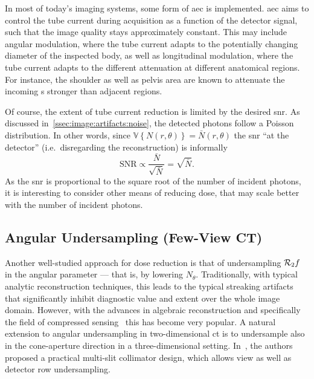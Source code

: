\documentclass[../ml-ct.tex]{subfiles}
\begin{document}
In most of today's imaging systems, some form of \gls{aec} is implemented.
\gls{aec} aims to control the tube current during acquisition as a function of the detector signal, such that the image quality stays approximately constant.
This may include angular modulation, where the tube current adapts to the potentially changing diameter of the inspected body, as well as longitudinal modulation, where the tube current adapts to the different attenuation at different anatomical regions.
For instance, the shoulder as well as pelvis area are known to attenuate the incoming \xray{}s stronger than adjacent regions.

Of course, the extent of tube current reduction is limited by the desired \gls{snr}.
As discussed in~\cref{ssec:image:artifacts:noise}, the detected photons follow a Poisson distribution.
In other words, since \( \mathbb{V} \left\{ N(r, \theta) \right\} = \bar{N}(r, \theta) \) the \gls{snr} \enquote{at the detector} (i.e.\ disregarding the reconstruction) is informally
\begin{equation}
	\mathrm{SNR} \propto \frac{\bar{N}}{\sqrt{\bar{N}}} = \sqrt{\bar{N}}.
\end{equation}
As the \gls{snr} is proportional to the square root of the number of incident photons, it is interesting to consider other means of reducing dose, that may scale better with the number of incident photons.
\subsection{Angular Undersampling (Few-View CT)}
Another well-studied approach for dose reduction is that of undersampling \( \mathcal{R}_2 f \) in the angular parameter --- that is, by lowering \( N_\theta \).
Traditionally, with typical analytic reconstruction techniques, this leads to the typical streaking artifacts that significantly inhibit diagnostic value and extent over the whole image domain.
However, with the advances in algebraic reconstruction and specifically the field of compressed sensing~\cite{donoho_compressed_2006} this has become very popular.
A natural extension to angular undersampling in two-dimensional \gls{ct} is to undersample also in the cone-aperture direction in a three-dimensional setting.
In~\cite{chen_sparsect_2019}, the authors proposed a practical multi-slit collimator design, which allows view as well as detector row undersampling.
\end{document}
